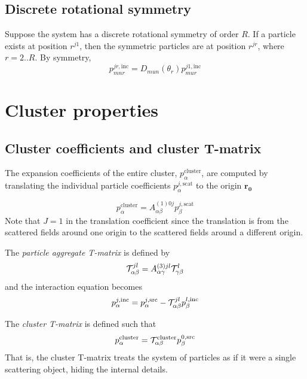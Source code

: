 \documentclass[11pt]{article}
\begin{document}
\subsection{Discrete rotational symmetry}
Suppose the system has a discrete rotational symmetry of order $R$.
If a particle exists at position $r^{j1}$, then the symmetric particles are at position $r^{jr}$, where $r = 2..R$.
By symmetry,
\begin{equation}
    p^{jr,\text{inc}}_{mnr} = D_{mun}(\theta_r) p^{j1,\text{inc}}_{mur}
    \label{eqn:rotational_symmetry}
\end{equation}

\section{Cluster properties}

\subsection{Cluster coefficients and cluster T-matrix}
The expansion coefficients of the entire cluster, $p_{\alpha}^{\text{cluster}}$, are computed by translating the individual particle coefficients $p_{\alpha}^{j,\text{scat}}$ to the origin $\bm{r_0}$

\begin{equation}
    p_{\alpha}^{\text{cluster}} = 
    A_{\alpha \beta}^{(1)0j}
    p_{\beta}^{j,\text{scat}}
\label{eqn:cluster_coefficients}
\end{equation}
Note that $J=1$ in the translation coefficient since the translation is from the scattered fields around one origin to the scattered fields around a different origin.

The \emph{particle aggregate T-matrix} is defined by 
\begin{equation}
    \mathcal{T}_{\alpha\beta}^{jl} =
    A_{\alpha \gamma}^{(3)jl}
    \mathcal{T}_{\gamma \beta}^l
\label{eqn:particle_aggregate_tmatrix}
\end{equation}
and the interaction equation becomes
\begin{equation}
    p_{\alpha}^{j,\text{inc}} = 
    p_{\alpha}^{j,\text{src}} -
    \mathcal{T}_{\alpha \beta}^{jl}
    p_{\beta}^{l,\text{inc}}
\end{equation}

The \emph{cluster T-matrix} is defined such that
\begin{equation}
    p_\alpha^{\text{cluster}} = \mathcal{T}_{\alpha\beta}^{\text{cluster}} p_\beta^{0,\text{src}}
\label{eqn:cluster_tmatrix}
\end{equation}
That is, the cluster T-matrix treats the system of particles as if it were a single scattering object, hiding the internal details.
\end{document}
